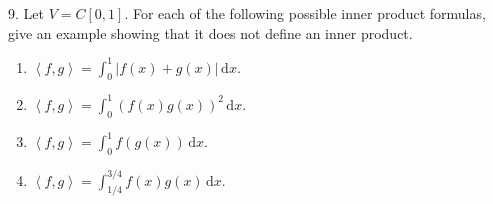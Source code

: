 \documentclass{article}
\begin{document}
9. Let $V = C[0, 1]$. For each of the following possible inner product formulas, give an example showing that it does not define an inner product.

\begin{enumerate}

	\item $\displaystyle \left< f, g \right> = \int_0^1 |f(x) + g(x)|\,\text{d} x.$

	\item $\displaystyle \left< f, g \right> = \int_0^1 (f(x)g(x))^2\,\text{d} x.$

	\item $\displaystyle \left< f, g \right> = \int_0^1 f(g(x))\,\text{d} x.$

	\item $\displaystyle \left< f, g \right> = \int_{1/4}^{3/4} f(x)g(x)\,\text{d} x.$

\end{enumerate}
\end{document}
